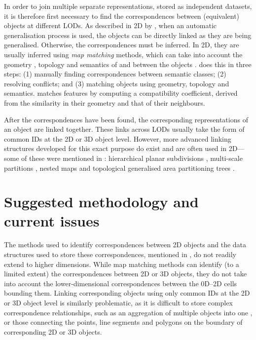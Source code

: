 In order to join multiple separate representations, stored as independent datasets, it is therefore first necessary to find the correspondences between (equivalent) objects at different LODs.
As described in 2D by \citet{Hampe03}, when an automatic generalisation process is used, the objects can be directly linked as they are being generalised.
Otherwise, the correspondences must be inferred.
In 2D, they are usually inferred using \emph{map matching} methods, which can take into account the geometry \citep{Veltkamp01}, topology and semantics of and between the objects \citep{Devogele96}.
\citet{Devogele96} does this in three steps: (1) manually finding correspondences between semantic classes; (2) resolving conflicts; and (3) matching objects using geometry, topology and semantics.
\citet{Zhang14} matches features by computing a compatibility coefficient, derived from the similarity in their geometry and that of their neighbours.

After the correspondences have been found, the corresponding representations of an object are linked together.
These links across LODs usually take the form of common IDs at the 2D or 3D object level.
However, more advanced linking structures developed for this exact purpose do exist and are often used in 2D---some of these were mentioned in : hierarchical planar subdivisions \citep{Filho95}, multi-scale partitions \citep{Rigaux95}, nested maps \citep{Plumer97} and topological generalised area partitioning trees \citep{vanOosterom05}.

\section{Suggested methodology and current issues}
\label{se:linking-methodology}

The methods used to identify correspondences between 2D objects and the data structures used to store these correspondences, mentioned in , do not readily extend to higher dimensions.
While map matching methods can identify (to a limited extent) the correspondences between 2D or 3D objects, they do not take into account the lower-dimensional correspondences between the 0D--2D cells bounding them.
Linking corresponding objects using only common IDs at the 2D or 3D object level is similarly problematic, as it is difficult to store complex correspondence relationships, such as an aggregation of multiple objects into one \citep{Biljecki14}, or those connecting the points, line segments and polygons on the boundary of corresponding 2D or 3D objects.

